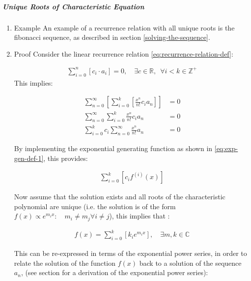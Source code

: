 \documentclass[11pt]{article}
\begin{document}
\subparagraph{Unique Roots of Characteristic Equation}
\label{uniq-roots-recurrence}
\begin{enumerate}
\item Example
\label{sec:org9dbe6e0}
An example of a recurrence relation with all unique roots is the fibonacci sequence, as described in section \ref{solving-the-sequence}.
\item Proof
\label{sec:org03e8a58}
Consider the linear recurrence relation \eqref{eq:recurrence-relation-def}:

\begin{align}
\sum^{n}_{i= 0}   \left[ c_i \cdot  a_i \right] = 0, \quad \exists c \in
\mathbb{R}, \enspace \forall i<k\in\mathbb{Z}^+ \nonumber \label{eq:recurrence-relation-def}
\end{align}
This implies:


\begin{align}
    \sum^{\infty}_{n= 0}   \left[ \sum^{k}_{i= 0}   \left[ \frac{x^n}{n!} c_i a_n \right]  \right]  &= 0 \\
    \sum^{\infty}_{n= 0}    \sum^{k}_{i= 0}    \frac{x^n}{n!} c_i a_n    &= 0 \\
        \sum^{k}_{i= 0} c_i \sum^{\infty}_{n= 0}    \frac{x^n}{n!}  a_n    &= 0
\end{align}

By implementing the exponential generating function as shown in
\eqref{eq:exp-gen-def-1}, this provides:

\begin{align}
   \sum^{k}_{i= 0}   \left[ c_i f^{\left( i \right)}\left( x \right) \right]
\end{align}


Now assume that the solution exists and all roots of the characteristic polynomial are unique (i.e. the solution is of the form \(f{\left({ x }\right)} \propto e^{m_i x}: \quad m_i \neq m_j \forall i\neq j\)), this implies that  \cite[Ch. 4]{zillDifferentialEquations2009a} :

\begin{align}
    f{\left({ x }\right)} = \sum^{k}_{i= 0}   {\left[{ k_i e^{m_i x} }\right]}, \quad \exists m,k \in \mathbb{C} \nonumber
\end{align}

This can be re-expressed in terms of the exponential power series, in order to relate the solution of the function \(f{\left({ x }\right)}\) back to a solution of the sequence \(a_n\), (see section for a derivation of the exponential power series):


\end{enumerate}
\end{document}
